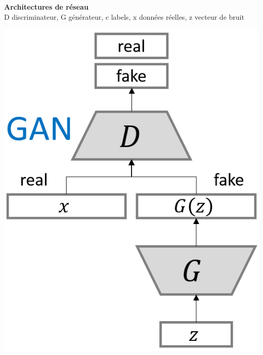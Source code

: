 \documentclass[a0,portrait]{a0poster}
\begin{document}
\begin{multicols}{2}
\begin{tcolorbox}[colback=blue!5!white,colframe=blue!75!black,title={\section*{Types de GANs}}]
\textbf{Architectures de réseau}\\
D discriminateur, G générateur, c labels, x données réelles, z vecteur de bruit
\begin{center}
\begin{minipage}{0.24\textwidth}
    \includegraphics[width=1.0\textwidth]{./GAN_normal.png}
\end{minipage}
\begin{minipage}{0.31\textwidth}

\end{minipage}
\end{center}
\end{tcolorbox}
\end{multicols}
\end{document}
